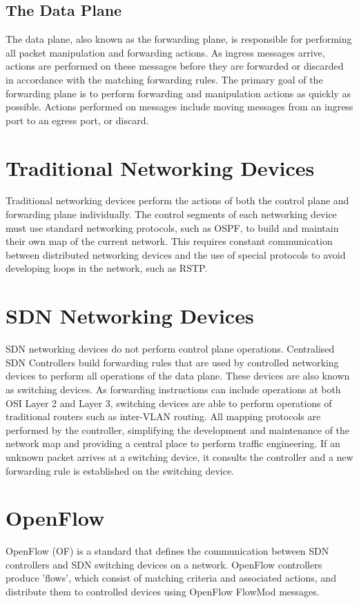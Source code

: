 \subsection{The Data Plane}
The data plane, also known as the forwarding plane, is responsible for performing all packet manipulation and forwarding actions. As ingress messages arrive, actions are performed on these messages before they are forwarded or discarded in accordance with the matching forwarding rules. 
The primary goal of the forwarding plane is to perform forwarding and manipulation actions as quickly as possible. Actions performed on messages include moving messages from an ingress port to an egress port, or discard.

\section{Traditional Networking Devices}
Traditional networking devices perform the actions of both the control plane and forwarding plane individually. 
The control segments of each networking device must use standard networking protocols, such as OSPF, to build and maintain their own map of the current network. This requires constant communication between distributed networking devices and the use of special protocols to avoid developing loops in the network, such as RSTP.

\section{SDN Networking Devices}
SDN networking devices do not perform control plane operations. Centralised SDN Controllers build forwarding rules that are used by controlled networking devices to perform all operations of the data plane. These devices are also known as switching devices.
As forwarding instructions can include operations at both OSI Layer 2 and Layer 3, switching devices are able to perform operations of traditional routers such as inter-VLAN routing.
All mapping protocols are performed by the controller, simplifying the development and maintenance of the network map and providing a central place to perform traffic engineering.
If an unknown packet arrives at a switching device, it consults the controller and a new forwarding rule is established on the switching device.

\section{OpenFlow}
OpenFlow (OF) is a standard that defines the communication between SDN controllers and SDN switching devices on a network. \cite{onf_open_flow} 
OpenFlow controllers produce 'flows', which consist of matching criteria and associated actions, and distribute them to controlled devices using OpenFlow FlowMod messages.

